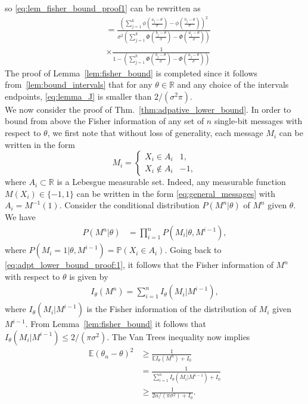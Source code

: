 \documentclass[letterpaper, conference]{IEEEtran}      %
\begin{document}
so \eqref{eq:lem_fisher_bound_proof1} can be rewritten as
\begin{align}
& =   \frac { \left( \sum_{j=1}^{k} \phi \left(\frac{a_j-\theta}{\sigma} \right) - \phi \left( \frac{b_j-\theta} {\sigma} \right)  \right)^2 } 
{\sigma^2 \left( \sum_{j=1}^k \Phi \left( \frac{b_j-\theta }{\sigma}\right) - \Phi \left( \frac{a_j-\theta }{\sigma}\right)  \right) }  \nonumber \\
& \times \frac {1} 
{1- \left( \sum_{j=1}^k \Phi \left( \frac{b_j-\theta }{\sigma}\right) - \Phi \left( \frac{a_j-\theta }{\sigma}\right)  \right) } 
\label{eq:lemma_J}
\end{align}
The proof of Lemma~\ref{lem:fisher_bound} is completed since it follows from~\ref{lem:bound_intervals} that for any $\theta \in \mathbb R$ and any choice of the intervals endpoints, \eqref{eq:lemma_J} is smaller than $2/(\sigma^2 \pi)$. \\


We now consider the proof of Thm.~\ref{thm:adpative_lower_bound}. In order to bound from above the Fisher information of any set of $n$ single-bit messages with respect to $\theta$, we first note that without loss of generality, each message $M_i$ can be written in the form
\begin{equation}
\label{eq:general_messages}
M_i = \begin{cases}
X_i \in A_i & 1, \\
X_i \notin A_i & -1,
\end{cases} 
\end{equation}
where $A_i \subset \mathbb R$ is a Lebesgue measurable set. Indeed, any measurable function $M(X_i) \in \{-1,1\}$ can be written in the form \eqref{eq:general_messages} with $A_i = M^{-1}(1)$. Consider the conditional distribution $P({M^n|\theta})$ of $M^n$ given $\theta$. We have 
\begin{align}
P\left( M^n | \theta \right) & =  \prod_{i=1}^n P\left(M_i | \theta, M^{i-1} \right), \label{eq:adpt_lower_bound_proof:1}
\end{align}
where $P\left(M_i =1 | \theta, M^{i-1}  \right) = \mathbb P\left( X_i \in A_i\right)$. Going back to \eqref{eq:adpt_lower_bound_proof:1}, it follows that the Fisher information of $M^n$ with respect to $\theta$ is given by 
\begin{align}
I_\theta(M^n) = \sum_{i=1}^n I_\theta (M_i|M^{i-1}),
\label{eq:fisher_information}
\end{align}
where $I_\theta (M_i|M^{i-1})$ is the Fisher information of the distribution of $M_i$ given $M^{i-1}$. From Lemma~\ref{lem:fisher_bound} it follows that $I_\theta (M_i|M^{i-1}) \leq 2/(\pi \sigma^2)$. The Van Trees inequality \cite{van2004detection, gill1995applications} now implies 
\begin{align*}
\mathbb E \left( \theta_n - \theta \right)^2 &  \geq \frac{1}{ \mathbb E I_\theta(M^n) + I_0} \\
& = \frac{1}{ \sum_{i=1}^n I_\theta (M_i | M^{i-1} ) + I_0} \\
& \geq \frac{1}{ 2n/(\pi \sigma^2) + I_0}.
\end{align*}
\end{document}
